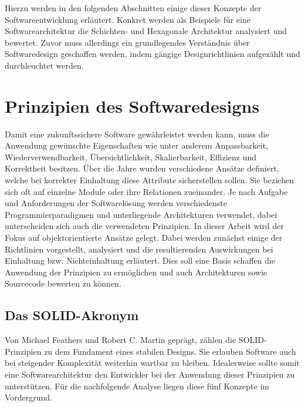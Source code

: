 \documentclass[conference]{IEEEtran}
\begin{document}
Hierzu werden in den folgenden Abschnitten einige dieser Konzepte der Softwareentwicklung erläutert. Konkret werden als Beispiele für eine Softwarearchitektur die Schichten- und Hexagonale Architektur analysiert und bewertet. Zuvor muss allerdings ein grundlegendes Verständnis über Softwaredesign geschaffen werden, indem gängige Designrichtlinien aufgezählt und durchleuchtet werden.


\section{Prinzipien des Softwaredesigns}

Damit eine zukunftssichere Software gewährleistet werden kann, muss die Anwendung gewünschte Eigenschaften wie unter anderem Anpassbarkeit, Wiederverwendbarkeit, Übersichtlichkeit, Skalierbarkeit, Effizienz und Korrektheit besitzen. Über die Jahre wurden verschiedene Ansätze definiert, welche bei korrekter Einhaltung diese Attribute sicherstellen sollen. Sie beziehen sich oft auf einzelne Module oder ihre Relationen zueinander. Je nach Aufgabe und Anforderungen der Softwarelösung werden verschiedenste Programmierparadigmen und unterliegende Architekturen verwendet, dabei unterscheiden sich auch die verwendeten Prinzipien. In dieser Arbeit wird der Fokus auf objektorientierte Ansätze gelegt. Dabei werden zunächst einige der Richtlinien vorgestellt, analysiert und die resultierenden Auswirkungen bei Einhaltung bzw. Nichteinhaltung erläutert. Dies soll eine Basis schaffen die Anwendung der Prinzipien zu ermöglichen und auch Architekturen sowie Sourcecode bewerten zu können.



\subsection{Das SOLID-Akronym}

Von Michael Feathers und Robert C. Martin geprägt, zählen die SOLID-Prinzipien zu dem Fundament eines stabilen Designs. Sie erlauben Software auch bei steigender Komplexität weiterhin wartbar zu bleiben. Idealerweise sollte somit eine Softwarearchitektur den Entwickler bei der Anwendung dieser Prinzipien zu unterstützen. Für die nachfolgende Analyse liegen diese fünf Konzepte im Vordergrund.

\end{document}
